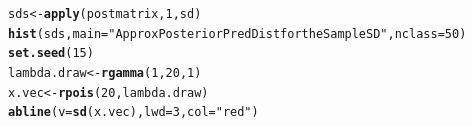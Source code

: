 \documentclass[12pt]{article}\usepackage[]{graphicx}\usepackage[]{color}
\makeatletter
\newcommand{\hlnum}[1]{\textcolor[rgb]{0.686,0.059,0.569}{#1}}%
\newcommand{\hlstr}[1]{\textcolor[rgb]{0.192,0.494,0.8}{#1}}%
\newcommand{\hlstd}[1]{\textcolor[rgb]{0.345,0.345,0.345}{#1}}%
\newcommand{\hlkwb}[1]{\textcolor[rgb]{0.69,0.353,0.396}{#1}}%
\newcommand{\hlkwc}[1]{\textcolor[rgb]{0.333,0.667,0.333}{#1}}%
\newcommand{\hlkwd}[1]{\textcolor[rgb]{0.737,0.353,0.396}{\textbf{#1}}}%
\newenvironment{kframe}{%
 \def\at@end@of@kframe{}%
 \ifinner\ifhmode%
  \def\at@end@of@kframe{\end{minipage}}%
  \begin{minipage}{\columnwidth}%
 \fi\fi%
 \def\FrameCommand##1{\hskip\@totalleftmargin \hskip-\fboxsep
 \colorbox{shadecolor}{##1}\hskip-\fboxsep
     \hskip-\linewidth \hskip-\@totalleftmargin \hskip\columnwidth}%
 \MakeFramed {\advance\hsize-\width
   \@totalleftmargin\z@ \linewidth\hsize
   \@setminipage}}%
 {\par\unskip\endMakeFramed%
 \at@end@of@kframe}
\newenvironment{knitrout}{}{} %
\makeatother
\begin{document}
\begin{knitrout}\footnotesize
{}\color{fgcolor}\begin{kframe}
\begin{alltt}
\hlstd{sds} \hlkwb{<-} \hlkwd{apply}\hlstd{(postmatrix,} \hlnum{1}\hlstd{, sd)}
\hlkwd{hist}\hlstd{(sds,} \hlkwc{main}\hlstd{=}\hlstr{"Approx Posterior Pred Dist for the Sample SD"}\hlstd{,} \hlkwc{nclass}\hlstd{=}\hlnum{50}\hlstd{)}
\hlkwd{set.seed}\hlstd{(}\hlnum{15}\hlstd{)}
\hlstd{lambda.draw} \hlkwb{<-} \hlkwd{rgamma}\hlstd{(}\hlnum{1}\hlstd{,} \hlnum{20}\hlstd{,} \hlnum{1}\hlstd{)}
\hlstd{x.vec} \hlkwb{<-} \hlkwd{rpois}\hlstd{(}\hlnum{20}\hlstd{, lambda.draw)}
\hlkwd{abline}\hlstd{(}\hlkwc{v}\hlstd{=}\hlkwd{sd}\hlstd{(x.vec),} \hlkwc{lwd}\hlstd{=}\hlnum{3}\hlstd{,} \hlkwc{col}\hlstd{=}\hlstr{"red"}\hlstd{)}
\end{alltt}
\end{kframe}
\end{knitrout}
\end{document}
